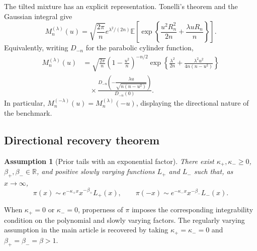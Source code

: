 \documentclass[numsec,webpdf,modern,medium,namedate]{oup-authoring-template}
\theoremstyle{thmstyleone}
\newtheorem{assumption}[theorem]{Assumption}
\theoremstyle{thmstyletwo}
\newcommand{\R}{\mathbb{R}}
\newcommand{\E}{\mathbb{E}}
\begin{document}
The tilted mixture has an explicit representation.  Tonelli's theorem
and the Gaussian integral give
\begin{equation}
\label{supp:eq:tilted-mixture-expectation}
  M_n^{(\lambda)}(u)
  =
  \sqrt{\frac{2\pi}{n}}
  e^{\lambda^2/(2n)}
  \E\left[
    \exp\left\{
      \frac{u^2R_n^2}{2n}
      +
      \frac{\lambda uR_n}{n}
    \right\}
  \right].
\end{equation}
Equivalently, writing $D_{-n}$ for the parabolic cylinder function,
\begin{align}
  M_n^{(\lambda)}(u)
  &={}
  \sqrt{\frac{2\pi}{n}}
  \left(1-\frac{u^2}{n}\right)^{-n/2}
  \exp\left\{
    \frac{\lambda^2}{2n}
    +
    \frac{\lambda^2u^2}{4n(n-u^2)}
  \right\}
  \nonumber\\
  &\quad\times
  \frac{
    D_{-n}\left(
      -\dfrac{\lambda u}{\sqrt{n(n-u^2)}}
    \right)
  }{
    D_{-n}(0)
  }.
\label{supp:eq:tilted-mixture-closed-form}
\end{align}
In particular,
$M_n^{(-\lambda)}(u)=M_n^{(\lambda)}(-u)$, displaying the
directional nature of the benchmark.

\subsection{Directional recovery theorem}
\label{supp:subsec:directional-recovery}

\begin{assumption}[Prior tails with an exponential factor]
\label{supp:ass:exponential-tails}
There exist $\kappa_+,\kappa_-\geq0$,
$\beta_+,\beta_-\in\R$, and positive slowly varying functions
$L_+$ and $L_-$ such that, as $x\to\infty$,
\begin{equation}
\label{supp:eq:exponential-tail-assumption}
  \pi(x)
  \sim
  e^{-\kappa_+x}x^{-\beta_+}L_+(x),
  \qquad
  \pi(-x)
  \sim
  e^{-\kappa_-x}x^{-\beta_-}L_-(x).
\end{equation}
\end{assumption}

When $\kappa_+=0$ or $\kappa_-=0$, properness of $\pi$ imposes the
corresponding integrability condition on the polynomial and slowly
varying factors.  The regularly varying assumption in the main article
is recovered by taking $\kappa_+=\kappa_-=0$ and
$\beta_+=\beta_-=\beta>1$.
\end{document}
